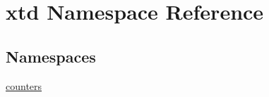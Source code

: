 \hypertarget{namespacextd}{\section{xtd Namespace Reference}
\label{namespacextd}
}
\subsection*{Namespaces}
\begin{DoxyCompactItemize}
\item 
\hyperlink{namespacextd_1_1counters}{counters}
\end{DoxyCompactItemize}
